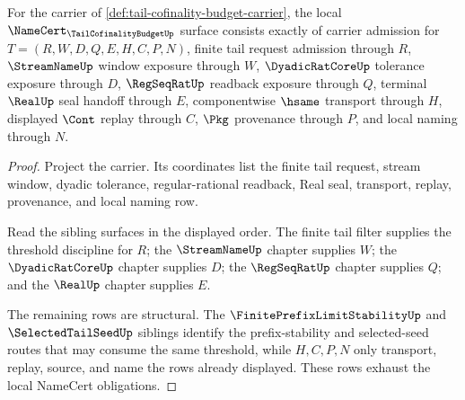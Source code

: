 \begin{theorem}
\label{thm:tail-cofinality-budget-namecert-obligations}
For the carrier of \autoref{def:tail-cofinality-budget-carrier}, the local $\NameCert_{\TailCofinalityBudgetUp}$ surface consists exactly of carrier admission for $T=(R,W,D,Q,E,H,C,P,N)$, finite tail request admission through $R$, $\StreamNameUp$ window exposure through $W$, $\DyadicRatCoreUp$ tolerance exposure through $D$, $\RegSeqRatUp$ readback exposure through $Q$, terminal $\RealUp$ seal handoff through $E$, componentwise $\hsame$ transport through $H$, displayed $\Cont$ replay through $C$, $\Pkg$ provenance through $P$, and local naming through $N$.
\end{theorem}
\begin{proof}
Project the carrier. Its coordinates list the finite tail request, stream window, dyadic tolerance, regular-rational readback, Real seal, transport, replay, provenance, and local naming row.

Read the sibling surfaces in the displayed order. The finite tail filter supplies the threshold discipline for $R$; the $\StreamNameUp$ chapter supplies $W$; the $\DyadicRatCoreUp$ chapter supplies $D$; the $\RegSeqRatUp$ chapter supplies $Q$; and the $\RealUp$ chapter supplies $E$.

The remaining rows are structural. The $\FinitePrefixLimitStabilityUp$ and $\SelectedTailSeedUp$ siblings identify the prefix-stability and selected-seed routes that may consume the same threshold, while $H,C,P,N$ only transport, replay, source, and name the rows already displayed. These rows exhaust the local NameCert obligations.
\end{proof}

